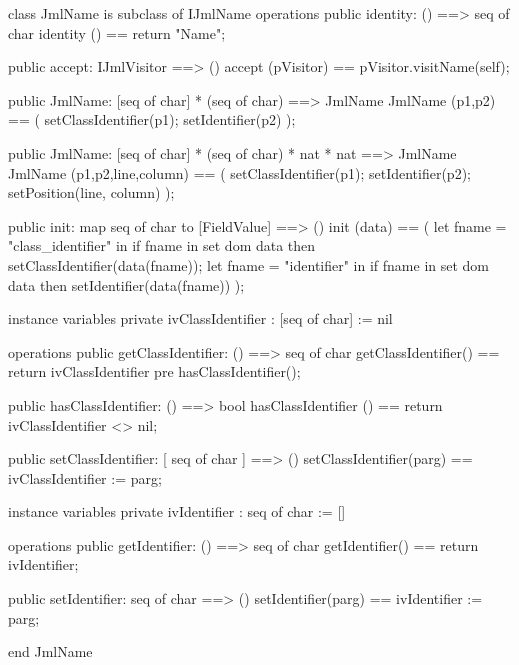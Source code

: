 \begin{vdm_al}
class JmlName is subclass of IJmlName
operations
  public identity: () ==> seq of char
  identity () == return "Name";

  public accept: IJmlVisitor ==> ()
  accept (pVisitor) == pVisitor.visitName(self);

  public JmlName:
    [seq of char] *
    (seq of char) ==> JmlName
  JmlName (p1,p2) == 
    ( setClassIdentifier(p1);
      setIdentifier(p2) );

  public JmlName:
    [seq of char] *
    (seq of char) *
    nat *
    nat ==> JmlName
  JmlName (p1,p2,line,column) == 
    ( setClassIdentifier(p1);
      setIdentifier(p2);
      setPosition(line, column) );

  public init: map seq of char to [FieldValue] ==> ()
  init (data) ==
    ( let fname = "class_identifier" in
        if fname in set dom data
        then setClassIdentifier(data(fname));
      let fname = "identifier" in
        if fname in set dom data
        then setIdentifier(data(fname)) );

instance variables
  private ivClassIdentifier : [seq of char] := nil

operations
  public getClassIdentifier: () ==> seq of char
  getClassIdentifier() == return ivClassIdentifier
    pre hasClassIdentifier();

  public hasClassIdentifier: () ==> bool
  hasClassIdentifier () == return ivClassIdentifier <> nil;

  public setClassIdentifier: [ seq of char ] ==> ()
  setClassIdentifier(parg) == ivClassIdentifier := parg;

instance variables
  private ivIdentifier : seq of char := []

operations
  public getIdentifier: () ==> seq of char
  getIdentifier() == return ivIdentifier;

  public setIdentifier: seq of char ==> ()
  setIdentifier(parg) == ivIdentifier := parg;

end JmlName
\end{vdm_al}

